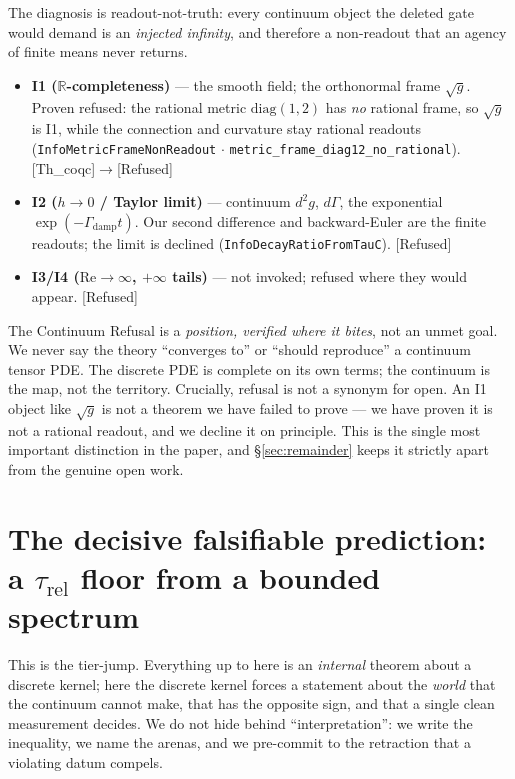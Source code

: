 \documentclass[10pt,twocolumn]{article}
\theoremstyle{definition}
\newcommand{\Thq}{\textsf{[Th\_coqc]}}
\newcommand{\Refu}{\textsf{[Refused]}}
\newcommand{\code}[1]{\texttt{#1}}
\begin{document}
The diagnosis is readout-not-truth: every continuum object the deleted gate would demand is
an \emph{injected infinity}, and therefore a non-readout that an agency of finite means never
returns.
\begin{itemize}\itemsep2pt
\item \textbf{I1 ($\mathbb{R}$-completeness)} --- the smooth field; the orthonormal frame
  $\sqrt{g}$. Proven refused: the rational metric $\mathrm{diag}(1,2)$ has \emph{no} rational
  frame, so $\sqrt{g}$ is I1, while the connection and curvature stay rational readouts
  (\code{InfoMetricFrameNonReadout} $\cdot$ \code{metric\_frame\_diag12\_no\_rational}). \Thq{}$\to$\Refu{}
\item \textbf{I2 ($h\!\to\!0$ / Taylor limit)} --- continuum $d^2 g$, $d\Gamma$, the
  exponential $\exp(-\Gamma_{\mathrm{damp}} t)$. Our second difference and backward-Euler are the finite
  readouts; the limit is declined (\code{InfoDecayRatioFromTauC}). \Refu{}
\item \textbf{I3/I4 ($\mathrm{Re}\to\infty$, $+\infty$ tails)} --- not invoked; refused where
  they would appear. \Refu{}
\end{itemize}

The Continuum Refusal is a \emph{position, verified where it bites}, not an unmet goal. We
never say the theory ``converges to'' or ``should reproduce'' a continuum tensor PDE. The
discrete PDE is complete on its own terms; the continuum is the map, not the territory.
Crucially, refusal is not a synonym for open. An I1 object like $\sqrt{g}$ is not a theorem
we have failed to prove --- we have proven it is not a rational readout, and we decline it on
principle. This is the single most important distinction in the paper, and \S\ref{sec:remainder}
keeps it strictly apart from the genuine open work.

\section{The decisive falsifiable prediction: a $\tau_{\mathrm{rel}}$ floor from a bounded spectrum}
\label{sec:prediction}

This is the tier-jump. Everything up to here is an \emph{internal} theorem about a
discrete kernel; here the discrete kernel forces a statement about the \emph{world}
that the continuum cannot make, that has the opposite sign, and that a single clean
measurement decides. We do not hide behind ``interpretation'': we write the inequality,
we name the arenas, and we pre-commit to the retraction that a violating datum compels.
\end{document}
